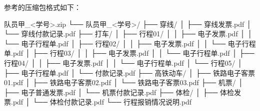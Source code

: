 参考的压缩包格式如下：
\begin{FileTree}
队员甲_<学号>.zip
└── 队员甲_<学号>/
    ├── 穿线/
    │   ├── 穿线发票.pdf
    │   └── 穿线付款记录.pdf
    ├── 打车/
    │   ├── 行程01/
    │   │   ├── 电子发票.pdf
    │   │   └── 电子行程单.pdf
    │   ├── 行程02/
    │   │   ├── 电子发票.pdf
    │   │   └── 电子行程单.pdf
    │   ├── 行程03/
    │   │   ├── 电子发票.pdf
    │   │   └── 电子行程单.pdf
    │   ├── 行程04/
    │   │   ├── 电子发票.pdf
    │   │   └── 电子行程单.pdf
    │   └── 行程05/
    │       ├── 电子行程单.pdf
    │       └── 付款记录.pdf
    ├── 高铁动车/
    │   ├── 铁路电子客票01.pdf
    │   ├── 铁路电子客票02.pdf
    │   └── 铁路电子客票03.pdf
    ├── 机票/
    │   ├── 电子普通发票.pdf
    │   └── 机票付款记录.pdf
    ├── 体检/
    │   ├── 体检发票.pdf
    │   └── 体检付款记录.pdf
    └── 行程报销情况说明.pdf
\end{FileTree}
